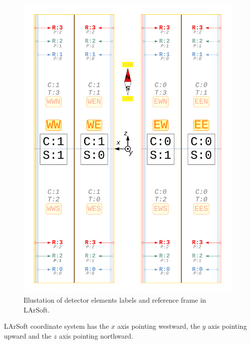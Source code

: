 \begin{figure}[p]
  \begin{center}
    \includegraphics[height=0.8\textheight]{figures/LArSoftLabels}
  \end{center}
  \caption{
    Illustation of detector elements labels and reference frame in LArSoft.
    \label{fig:LArSoftLabels}
  }
\end{figure}

LArSoft coordinate system has the $x$ axis pointing westward,
the $y$ axis pointing upward and the $z$ axis pointing northward.

